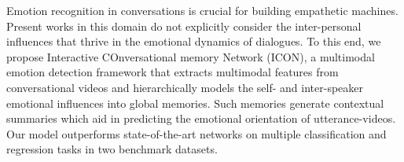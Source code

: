 Emotion recognition in conversations is crucial for building empathetic machines. Present works in this domain do not explicitly consider the inter-personal influences that thrive in the emotional dynamics of dialogues. To this end, we propose Interactive COnversational memory Network (ICON), a multimodal emotion detection framework that extracts multimodal features from conversational videos and hierarchically models the self- and inter-speaker emotional influences into global memories. Such memories generate contextual summaries which aid in predicting the emotional orientation of utterance-videos. Our model outperforms state-of-the-art networks on multiple classification and regression tasks in two benchmark datasets.
